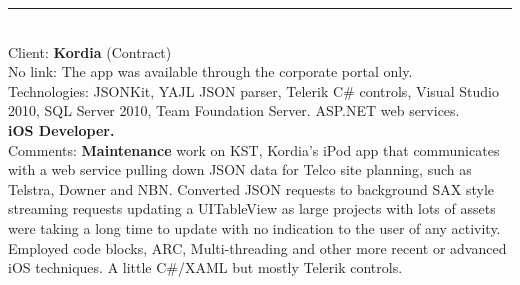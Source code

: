 \documentclass{article}
\begin{document}

\noindent\hfil\rule{0.5\textwidth}{.4pt}\hfil
\\

%


Client: 	\textbf  {Kordia} (Contract) \\
No link: The app was available through the corporate portal only. \\
Technologies: 	JSONKit, YAJL JSON parser, Telerik C\# controls, Visual Studio 2010, SQL Server 2010, Team Foundation Server. ASP.NET web services.\\
\textbf{ iOS Developer. }\\
Comments:	{\bf Maintenance} work on KST, Kordia's iPod app that communicates with a web service pulling down JSON data for Telco site planning, such as Telstra, Downer and NBN. Converted JSON requests to background SAX style streaming requests updating a UITableView as large projects with lots of assets were taking a long time to update with no indication to the user of any activity.
	Employed code blocks, ARC, Multi-threading and other more recent or advanced iOS techniques. A little C\#/XAML but mostly Telerik controls.  \\
\\
\end{document}
